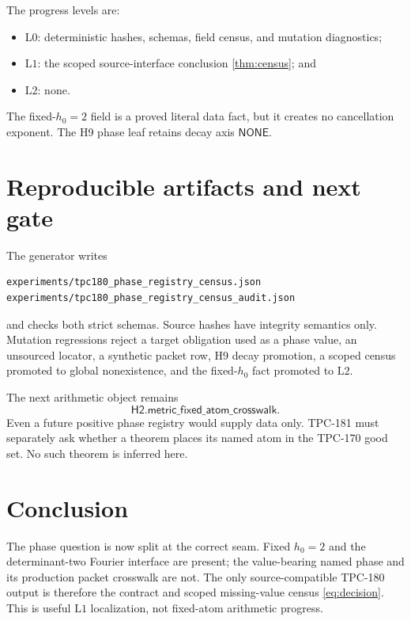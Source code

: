 \documentclass[11pt]{article}
\theoremstyle{definition}
\theoremstyle{remark}
\newcommand{\Lzero}{\mathrm{L0}}
\newcommand{\Lone}{\mathrm{L1}}
\newcommand{\Ltwo}{\mathrm{L2}}
\begin{document}
The progress levels are:
\begin{itemize}[leftmargin=2em]
\item \(\Lzero\): deterministic hashes, schemas, field census, and
  mutation diagnostics;
\item \(\Lone\): the scoped source-interface conclusion
  \cref{thm:census}; and
\item \(\Ltwo\): none.
\end{itemize}
The fixed-\(h_0=2\) field is a proved literal data fact, but it creates
no cancellation exponent.  The H9 phase leaf retains decay axis
\(\mathsf{NONE}\).

\section{Reproducible artifacts and next gate}

The generator writes
\begin{verbatim}
experiments/tpc180_phase_registry_census.json
experiments/tpc180_phase_registry_census_audit.json
\end{verbatim}
and checks both strict schemas.  Source hashes have integrity
semantics only.  Mutation regressions reject a target obligation used
as a phase value, an unsourced locator, a synthetic packet row, H9
decay promotion, a scoped census promoted to global nonexistence, and
the fixed-\(h_0\) fact promoted to \(\Ltwo\).

The next arithmetic object remains
\[
 \mathsf{H2.metric\_fixed\_atom\_crosswalk}.
\tag{10}\label{eq:next}
\]
Even a future positive phase registry would supply data only.  TPC-181
must separately ask whether a theorem places its named atom in the
TPC-170 good set.  No such theorem is inferred here.

\section{Conclusion}

The phase question is now split at the correct seam.  Fixed
\(h_0=2\) and the determinant-two Fourier interface are present; the
value-bearing named phase and its production packet crosswalk are not.
The only source-compatible TPC-180 output is therefore the contract
and scoped missing-value census \eqref{eq:decision}.  This is useful
\(\Lone\) localization, not fixed-atom arithmetic progress.

\nocite{*}


\end{document}
